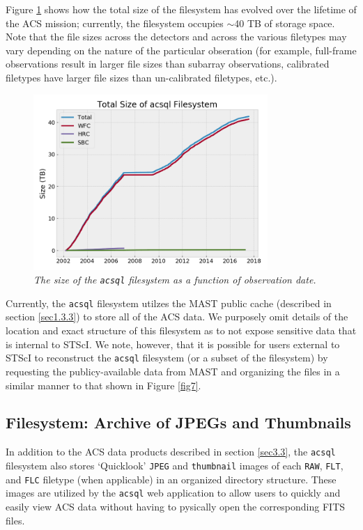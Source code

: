 \documentclass[10pt,journal,compsoc]{IEEEtran}
\begin{document}
Figure \ref{fig8} shows how the total size of the filesystem has evolved over the lifetime of the ACS mission; currently, the filesystem occupies $\sim${40} TB of storage space.
Note that the file sizes across the detectors and across the various filetypes may vary depending on the nature of the particular obseration (for example, full-frame observations
result in larger file sizes than subarray observations, calibrated filetypes have larger file sizes than un-calibrated filetypes, etc.).

\begin{figure}[!h]
\centering
\includegraphics[width=3.5in]{./figures/filesystem_size.png}
\caption{\textit{The size of the \texttt{acsql} filesystem as a function of observation
date.}}
\label{fig8}
\end{figure}

Currently, the \texttt{acsql} filesystem utilzes the MAST public cache (described in section \ref{sec1.3.3}) to store all of the ACS data.  We purposely omit details of the location
and exact structure of this filesystem as to not expose sensitive data that is internal to STScI.  We note, however, that it is possible for users external to STScI to reconstruct the
\texttt{acsql} filesystem (or a subset of the filesystem) by requesting the publicy-available data from MAST and organizing the files in a similar manner to that shown in Figure \ref{fig7}.


\subsection{Filesystem: Archive of JPEGs and Thumbnails} \label{sec3.4}

In addition to the ACS data products described in section \ref{sec3.3}, the \texttt{acsql} filesystem also stores `Quicklook' \texttt{JPEG} and \texttt{thumbnail} images of each
\texttt{RAW}, \texttt{FLT}, and \texttt{FLC} filetype (when applicable) in an organized directory structure.  These images are utilized by the \texttt{acsql} web application to allow users to
quickly and easily view ACS data without having to pysically open the corresponding FITS files.
\end{document}
